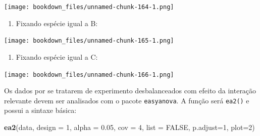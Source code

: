 \documentclass[
]{article}
\newenvironment{Shaded}{\begin{snugshade}}{\end{snugshade}}
\newcommand{\DataTypeTok}[1]{\textcolor[rgb]{0.13,0.29,0.53}{#1}}
\newcommand{\DecValTok}[1]{\textcolor[rgb]{0.00,0.00,0.81}{#1}}
\newcommand{\FloatTok}[1]{\textcolor[rgb]{0.00,0.00,0.81}{#1}}
\newcommand{\KeywordTok}[1]{\textcolor[rgb]{0.13,0.29,0.53}{\textbf{#1}}}
\newcommand{\NormalTok}[1]{#1}
\newcommand{\OperatorTok}[1]{\textcolor[rgb]{0.81,0.36,0.00}{\textbf{#1}}}
\newcommand{\OtherTok}[1]{\textcolor[rgb]{0.56,0.35,0.01}{#1}}
\newcommand{\StringTok}[1]{\textcolor[rgb]{0.31,0.60,0.02}{#1}}
\providecommand{\tightlist}{%
  \setlength{\itemsep}{0pt}\setlength{\parskip}{0pt}}
\begin{document}
\begin{Shaded}
\end{Shaded}

\texttt{[image: bookdown\_files/unnamed-chunk-164-1.png]}

\begin{enumerate}
\def\labelenumi{\arabic{enumi}.}
\setcounter{enumi}{7}
\tightlist
\item
  Fixando espécie igual a B:
\end{enumerate}

\begin{Shaded}
\end{Shaded}

\texttt{[image: bookdown\_files/unnamed-chunk-165-1.png]}

\begin{enumerate}
\def\labelenumi{\arabic{enumi}.}
\setcounter{enumi}{8}
\tightlist
\item
  Fixando espécie igual a C:
\end{enumerate}

\begin{Shaded}
\end{Shaded}

\texttt{[image: bookdown\_files/unnamed-chunk-166-1.png]}

Os dados por se tratarem de experimento desbalanceados com efeito da interação relevante devem ser analisados com o pacote \texttt{easyanova}. A função será \texttt{ea2()} e possui a sintaxe básica:

\begin{Shaded}
\begin{Highlighting}[]
\KeywordTok{ea2}\NormalTok{(data, }\DataTypeTok{design =} \DecValTok{1}\NormalTok{, }\DataTypeTok{alpha =} \FloatTok{0.05}\NormalTok{, }\DataTypeTok{cov =} \DecValTok{4}\NormalTok{, }\DataTypeTok{list =} \OtherTok{FALSE}\NormalTok{, }
    \DataTypeTok{p.adjust=}\DecValTok{1}\NormalTok{, }\DataTypeTok{plot=}\DecValTok{2}\NormalTok{)}
\end{Highlighting}
\end{Shaded}
\end{document}
